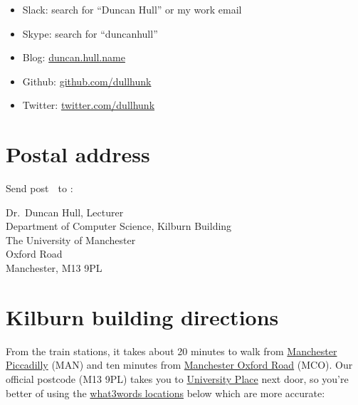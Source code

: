 \documentclass[12pt,]{book}
\providecommand{\tightlist}{%
  \setlength{\itemsep}{0pt}\setlength{\parskip}{0pt}}
\begin{document}
\begin{itemize}
\tightlist
\item
  Slack: search for ``Duncan Hull'' or my work email
\item
  Skype: search for ``duncanhull''
\item
  Blog: \href{https://duncan.hull.name}{duncan.hull.name}
\item
  Github: \href{https://github.com/dullhunk}{github.com/dullhunk}
\item
  Twitter: \href{https://twitter.com/dullhunk}{twitter.com/dullhunk}
\end{itemize}

\hypertarget{postal-address}{%
\section{Postal address}\label{postal-address}}

Send post 🐌 to :

Dr.~Duncan Hull, Lecturer\\
Department of Computer Science, Kilburn Building\\
The University of Manchester\\
Oxford Road\\
Manchester, M13 9PL

\hypertarget{kilburn-building-directions}{%
\section{Kilburn building directions}\label{kilburn-building-directions}}

From the train stations, it takes about 20 minutes to walk from \href{https://www.nationalrail.co.uk/stations_destinations/man.aspx}{Manchester Piccadilly} (MAN) and ten minutes from \href{https://www.nationalrail.co.uk/stations/mco/details.aspx}{Manchester Oxford Road} (MCO). Our official postcode (M13 9PL) takes you to \href{http://www.conference.manchester.ac.uk/venues/search/details/?property=10}{University Place} next door, so you're better of using the \href{https://www.bbc.co.uk/news/uk-england-49319760}{what3words locations} \citep{what3words} below which are more accurate:
\end{document}
